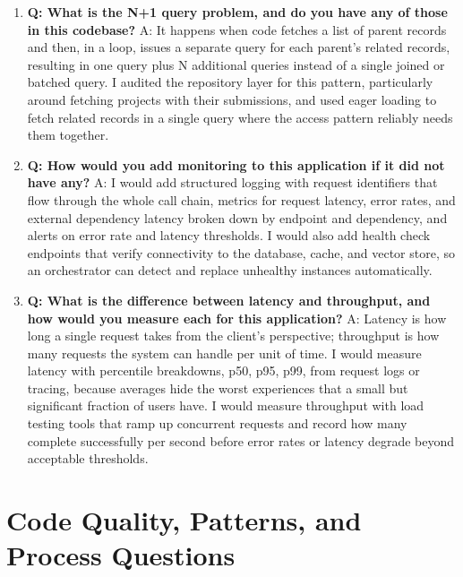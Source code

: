 \documentclass[11pt,a4paper]{report}
\begin{document}
\begin{enumerate}[leftmargin=*]
\item \textbf{Q: What is the N+1 query problem, and do you have any of those in this codebase?}
A: It happens when code fetches a list of parent records and then, in a loop, issues a separate query for each parent's related records, resulting in one query plus N additional queries instead of a single joined or batched query. I audited the repository layer for this pattern, particularly around fetching projects with their submissions, and used eager loading to fetch related records in a single query where the access pattern reliably needs them together.

\item \textbf{Q: How would you add monitoring to this application if it did not have any?}
A: I would add structured logging with request identifiers that flow through the whole call chain, metrics for request latency, error rates, and external dependency latency broken down by endpoint and dependency, and alerts on error rate and latency thresholds. I would also add health check endpoints that verify connectivity to the database, cache, and vector store, so an orchestrator can detect and replace unhealthy instances automatically.

\item \textbf{Q: What is the difference between latency and throughput, and how would you measure each for this application?}
A: Latency is how long a single request takes from the client's perspective; throughput is how many requests the system can handle per unit of time. I would measure latency with percentile breakdowns, p50, p95, p99, from request logs or tracing, because averages hide the worst experiences that a small but significant fraction of users have. I would measure throughput with load testing tools that ramp up concurrent requests and record how many complete successfully per second before error rates or latency degrade beyond acceptable thresholds.
\end{enumerate}

\section{Code Quality, Patterns, and Process Questions}
\end{document}
